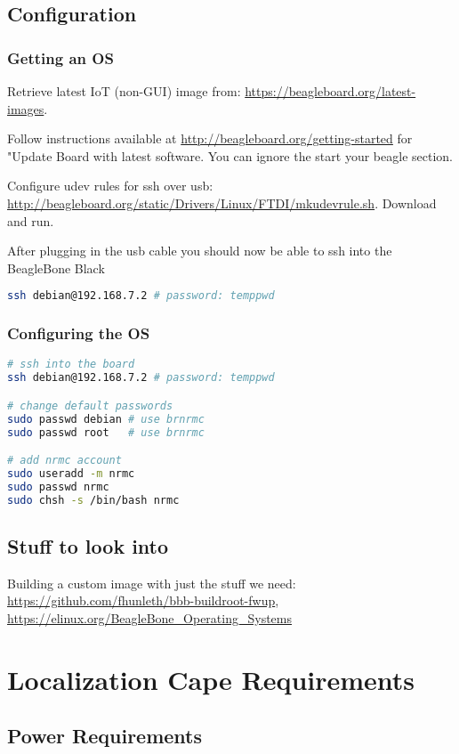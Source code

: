 \documentclass[]{book}
\begin{document}
\section{Configuration}
\subsection{Getting an OS}
Retrieve latest IoT (non-GUI) image from: \url{https://beagleboard.org/latest-images}.

Follow instructions available at \url{http://beagleboard.org/getting-started} for "Update Board with latest software. You can ignore the start your beagle section.

Configure udev rules for ssh over usb: \url{http://beagleboard.org/static/Drivers/Linux/FTDI/mkudevrule.sh}. Download and run.

After plugging in the usb cable you should now be able to ssh into the BeagleBone Black

\begin{lstlisting}[language=bash]
ssh debian@192.168.7.2 # password: temppwd
\end{lstlisting}

\pagebreak
\subsection{Configuring the OS}
\begin{lstlisting}[language=bash]
# ssh into the board
ssh debian@192.168.7.2 # password: temppwd

# change default passwords
sudo passwd debian # use brnrmc
sudo passwd root   # use brnrmc

# add nrmc account
sudo useradd -m nrmc
sudo passwd nrmc
sudo chsh -s /bin/bash nrmc

\end{lstlisting}


\section{Stuff to look into}
Building a custom image with just the stuff we need: \url{https://github.com/fhunleth/bbb-buildroot-fwup}, \url{https://elinux.org/BeagleBone_Operating_Systems}

\chapter{Localization Cape Requirements}
\section{Power Requirements}
\end{document}
